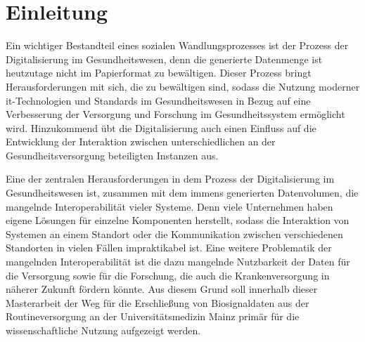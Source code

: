 \chapter{Einleitung} \label{ch:introduction}

Ein wichtiger Bestandteil eines sozialen Wandlungsprozesses ist der Prozess der Digitalisierung im Gesundheitswesen, denn die generierte Datenmenge ist heutzutage nicht im Papierformat zu bewältigen. Dieser Prozess bringt Herausforderungen mit sich, die zu bewältigen sind, sodass die Nutzung moderner \ac{it}-Technologien und Standards im Gesundheitswesen in Bezug auf eine Verbesserung der Versorgung und Forschung im Gesundheitssystem ermöglicht wird. Hinzukommend übt die Digitalisierung auch einen Einfluss auf die Entwicklung der Interaktion zwischen unterschiedlichen an der Gesundheitsversorgung beteiligten Instanzen aus. 

Eine der zentralen Herausforderungen in dem Prozess der Digitalisierung im Gesundheitswesen ist, zusammen mit dem immens generierten Datenvolumen, die mangelnde Interoperabilität vieler Systeme. Denn viele Unternehmen haben eigene Lösungen für einzelne Komponenten herstellt, sodass die Interaktion von Systemen an einem Standort oder die Kommunikation zwischen verschiedenen Standorten in vielen Fällen impraktikabel ist. Eine weitere Problematik der mangelnden Interoperabilität ist die dazu mangelnde Nutzbarkeit der Daten für die Versorgung sowie für die Forschung, die auch die Krankenversorgung in näherer Zukunft fördern könnte. Aus diesem Grund soll innerhalb dieser Masterarbeit der Weg für die Erschließung von Biosignaldaten aus der Routineversorgung an der Universitätsmedizin Mainz primär für die wissenschaftliche Nutzung aufgezeigt werden.